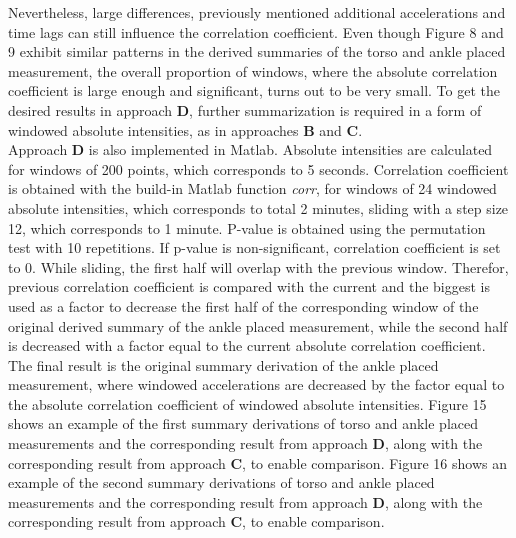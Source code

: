 \documentclass{article}
\begin{document}
{Nevertheless, large differences, previously mentioned additional accelerations and time lags can still influence the correlation coefficient. Even though Figure 8 and 9 exhibit similar patterns in the derived summaries of the torso and ankle placed measurement, the overall proportion of windows, where the absolute correlation coefficient is large enough and significant, turns out to be very small. To get the desired results in approach \textbf{D}, further summarization is required in a form of windowed absolute intensities, as in approaches \textbf{B} and \textbf{C}.\\ 
Approach \textbf{D} is also implemented in Matlab. Absolute intensities are calculated for windows of 200 points, which corresponds to 5 seconds. Correlation coefficient is obtained with the build-in Matlab function \textit{corr}, for windows of 24 windowed absolute intensities, which corresponds to total 2 minutes, sliding with a step size 12, which corresponds to 1 minute. P-value is obtained using the permutation test with 10 repetitions. If p-value is non-significant, correlation coefficient is set to 0. While sliding, the first half will overlap with the previous window. Therefor, previous correlation coefficient is compared with the current and the biggest is used as a factor to decrease the first half of the corresponding window of the original derived summary of the ankle placed measurement, while the second half is decreased with a factor equal to the current absolute correlation coefficient. The final result is the original summary derivation of the ankle placed measurement, where windowed accelerations are decreased by the factor equal to the absolute correlation coefficient of windowed absolute intensities. Figure 15 shows an example of the first summary derivations of torso and ankle placed measurements and the corresponding result from approach \textbf{D}, along with the corresponding result from approach \textbf{C}, to enable comparison. Figure 16 shows an example of the second summary derivations of torso and ankle placed measurements and the corresponding result from approach \textbf{D}, along with the corresponding result from approach \textbf{C}, to enable comparison.

}
\end{document}
